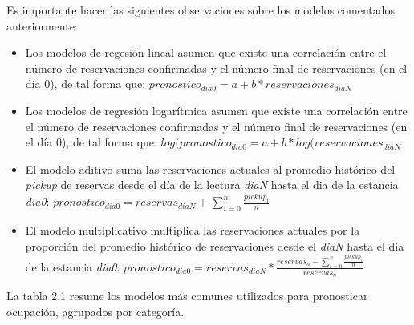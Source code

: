 {Es importante hacer las siguientes observaciones sobre los modelos comentados anteriormente:

\begin{itemize}
  \item Los modelos de regesión lineal asumen que existe una correlación entre el número de reservaciones confirmadas y el número final de reservaciones (en el día 0), de tal forma que: $pronostico_{dia0} = a + b * reservaciones_{diaN}$
  \item Los modelos de regresión logarítmica asumen que existe una correlación entre el número de reservaciones confirmadas y el número final de reservaciones (en el día 0), de tal forma que: $log(pronostico_{dia0} = a + b * log(reservaciones_{diaN}$
  \item El modelo aditivo suma las reservaciones actuales al promedio histórico del \emph{pickup} de reservas desde el día de la lectura \emph{diaN} hasta el dia de la estancia \emph{dia0}: $pronostico_{dia0} = reservas_{diaN} + \sum_{i=0}^{n} \frac{pickup_i}{n}$
  \item El modelo multiplicativo multiplica las reservaciones actuales por la proporción del promedio histórico de reservaciones  desde el \emph{diaN} hasta el dia de la estancia \emph{dia0}: $pronostico_{dia0} = reservas_{diaN} * \frac{reservas_n - \sum_{i=0}^{n} \frac{pickup_i}{n}}{reservas_n}$
\end{itemize}

La tabla 2.1 resume los modelos más comunes utilizados para pronosticar ocupación, agrupados por categoría.


}
